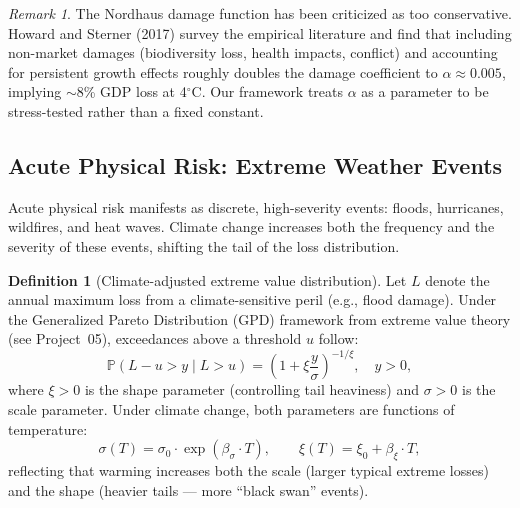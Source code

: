 \documentclass[11pt, a4paper]{article}
\theoremstyle{definition}
\newtheorem{definition}{Definition}[section]
\theoremstyle{plain}
\theoremstyle{remark}
\newtheorem{remark}{Remark}[section]
\newcommand{\PV}{\mathbb{P}}
\begin{document}
\begin{remark}
The Nordhaus damage function has been criticized as too conservative.
Howard and Sterner (2017) survey the empirical literature and find that including
non-market damages (biodiversity loss, health impacts, conflict) and accounting
for persistent growth effects roughly doubles the damage coefficient to
$\alpha \approx 0.005$, implying $\sim$8\% GDP loss at 4$^\circ$C.
Our framework treats $\alpha$ as a parameter to be stress-tested rather than a
fixed constant.
\end{remark}

\subsection{Acute Physical Risk: Extreme Weather Events}

Acute physical risk manifests as discrete, high-severity events: floods,
hurricanes, wildfires, and heat waves.
Climate change increases both the frequency and the severity of these events,
shifting the tail of the loss distribution.

\begin{definition}[Climate-adjusted extreme value distribution]\label{def:climate-evt}
Let $L$ denote the annual maximum loss from a climate-sensitive peril (e.g.,
flood damage).
Under the Generalized Pareto Distribution (GPD) framework from extreme value
theory (see Project~05), exceedances above a threshold $u$ follow:
\begin{equation}\label{eq:gpd-climate}
    \PV(L - u > y \mid L > u) = \left(1 + \xi \frac{y}{\sigma}\right)^{-1/\xi},
    \quad y > 0,
\end{equation}
where $\xi > 0$ is the shape parameter (controlling tail heaviness) and $\sigma > 0$
is the scale parameter.
Under climate change, both parameters are functions of temperature:
\begin{equation}\label{eq:climate-gpd-params}
    \sigma(T) = \sigma_0 \cdot \exp(\beta_\sigma \cdot T), \qquad
    \xi(T) = \xi_0 + \beta_\xi \cdot T,
\end{equation}
reflecting that warming increases both the scale (larger typical extreme losses)
and the shape (heavier tails --- more ``black swan'' events).
\end{definition}
\end{document}
